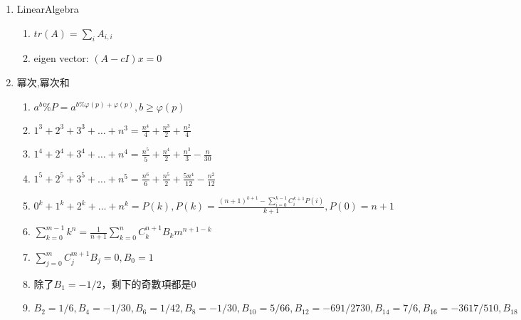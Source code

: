 \begin{enumerate}
\begin{enumerate}
\begin{enumerate}
		\item $\sum_{k\leq l} \binom{l - k}{m} \binom{s}{k - n}(-1)^k = (-1)^{l + m} \binom{s - m - 1}{l - n - m}$
		\item $\sum_{0 \leq k \leq l} \binom{l - k}{m} \binom{q + k}{n} = \binom{l + q + 1}{m + n + 1}$
		\item $\binom{r}{k} = (-1)^k\binom{k - r - 1}{k}$
		\item $\binom{r}{m} \binom{m}{k} = \binom{r}{k} \binom{r - k}{m - k}$
		\item $\sum_{k\leq n} \binom{r + k}{k} = \binom{r + n + 1}{n}$
		\item $\sum_{0\leq k \leq n} \binom{k}{m} = \binom{n + 1}{m + 1}$
		\item $\sum_{k\leq m}\binom{m + r}{k}x^ky^k = \sum_{k\leq m}\binom{-r}{k}(-x)^k (x+y)^{m-k}$	
	\end{enumerate}
\end{enumerate}
	
\item {LinearAlgebra}
\begin{enumerate} \itemsep = -3pt
\item $tr(A) = \sum_{i} A_{i, i}$
\item eigen vector: $(A - cI) x = 0$ 
\end{enumerate}

\item{冪次,冪次和}
\begin{enumerate}\itemsep = -3pt
	\item $a^b\%P=a^{b\% \varphi (p)+\varphi (p)},b\geq \varphi (p)$
	\item $1^3+2^3+3^3+\ldots +n^3=\frac{n^4}{4}+\frac{n^3}{2}+\frac{n^2}{4}$
	\item $1^4+2^4+3^4+\ldots +n^4=\frac{n^5}{5}+\frac{n^4}{2}+\frac{n^3}{3}-\frac{n}{30}$
	\item $1^5+2^5+3^5+\ldots +n^5=\frac{n^6}{6}+\frac{n^5}{2}+\frac{5n^4}{12}-\frac{n^2}{12}$
	\item $0^k+1^k+2^k+\ldots +n^k = P(k),P(k)=\frac{(n+1)^{k+1}-\sum_{i=0}^{k-1}C_i^{k+1}P(i)}{k+1},P(0)=n+1$
	\item $\sum_{k=0}^{m-1}k^n=\frac{1}{n+1}\sum_{k=0}^{n}C_k^{n+1}B_km^{n+1-k}$
	\item $\sum_{j=0}^{m}C_j^{m+1}B_j=0,B_0=1$
	\item 除了$B_1=-1/2$，剩下的奇數項都是$0$
	\item $B_2=1/6,B_4=-1/30,B_6=1/42,B_8=-1/30,B_{10}=5/66,B_{12}=-691/2730,B_{14}=7/6,B_{16}=-3617/510,B_{18}=43867/798,B_{20}=-174611/330,$
\end{enumerate}


\end{enumerate}

